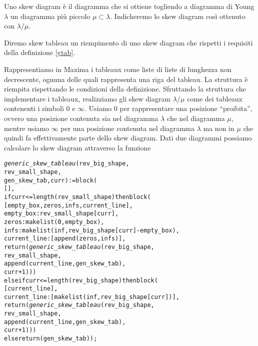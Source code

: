 \begin{defn}
Uno skew diagram \`e il diagramma che si ottiene togliendo a
diagramma di Young $\lambda$ un diagramma pi\`u piccolo $\mu \subset
\lambda$. Indicheremo lo skew diagram cos\`i ottenuto con $\lambda / \mu$.
\end{defn} 

\begin{defn}
Diremo skew tableau un riempimento di uno skew diagram che rispetti i
requisiti della definizione \ref{ytab}. 
\end{defn}

Rappresentiamo in Maxima i tableaux come liste di liste di lunghezza
non decrescente, ognuna delle quali rappresenta una riga del tableau.
La struttura \`e riempita rispettando le condizioni della definizione.
Sfruttando la struttura che implementare i tableaux, realizziamo gli
skew diagram $\lambda/\mu$ come dei tableaux contenenti i simboli $0$ e $\infty$.
Usiamo $0$ per rappresentare una posizione ``proibita'', ovvero una
posizione contenuta sia nel diagramma $\lambda$ che nel diagramma
$\mu$, mentre usiamo $\infty$ per una posizione contenuta nel
diagramma $\lambda$ ma non in $\mu$ che quindi fa effettivamente parte
dello skew diagram. Dati due diagrammi possiamo calcolare lo skew
diagram attraverso la funzione

\begin{alltt}
\emph{generic\_skew\_tableau} (rev\_big\_shape,
                      rev\_small\_shape,
                      gen\_skew\_tab, curr) := block (
  [],
  if curr <= length (rev\_small\_shape) then block (
    [empty\_box,zeros,infs,current\_line],
    empty\_box : rev\_small\_shape[curr],
    zeros : makelist (0, empty\_box),
    infs : makelist (inf, rev\_big\_shape[curr] - empty\_box),
    current\_line : [append (zeros, infs)],
    return (\emph{generic\_skew\_tableau} (rev\_big\_shape,
                                  rev\_small\_shape,
                                  append (current\_line, gen\_skew\_tab),
                                  curr + 1)))
  else if curr <= length (rev\_big\_shape) then block (
    [current\_line],
    current\_line : [makelist (inf, rev\_big\_shape[curr])],
    return (\emph{generic\_skew\_tableau} (rev\_big\_shape,
                                  rev\_small\_shape,
                                  append (current\_line, gen\_skew\_tab),
                                  curr + 1)))
  else return (gen\_skew\_tab));
\end{alltt}

